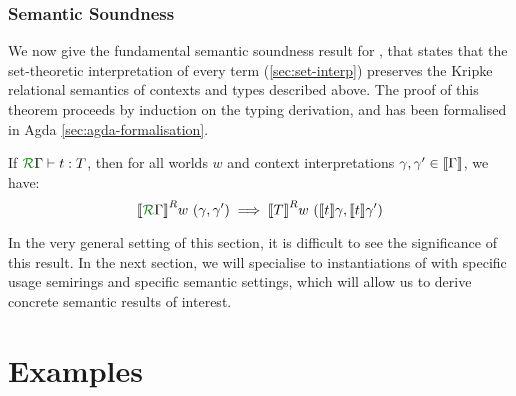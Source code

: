 \subsubsection{Semantic Soundness}

We now give the fundamental semantic soundness result for \name{},
that states that the set-theoretic interpretation of every term
(\autoref{sec:set-interp}) preserves the Kripke relational semantics
of contexts and types described above. The proof of this theorem
proceeds by induction on the typing derivation, and has been
formalised in Agda \autoref{sec:agda-formalisation}.

\begin{theorem}
  If $\grR\Gamma \vdash t : T$, then for all worlds $w$ and
  context interpretations $\gamma, \gamma' \in \sem{\Gamma}$, we have:
  \begin{displaymath}
    \sem{\grR\Gamma}^R w~(\gamma, \gamma') \implies \sem{T}^R w~(\sem{t}\gamma, \sem{t}\gamma')
  \end{displaymath}
\end{theorem}

In the very general setting of this section, it is difficult to see
the significance of this result. In the next section, we will
specialise to instantiations of \name{} with specific usage
semirings and specific semantic settings, which will allow us to
derive concrete semantic results of interest.

\section{Examples}
